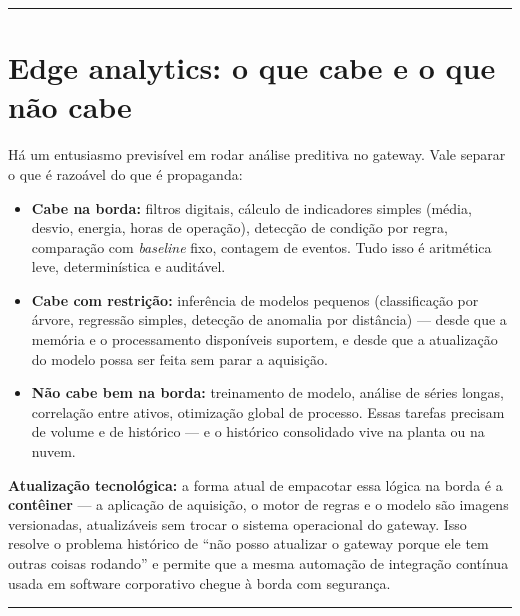 \begin{center}\rule{0.5\linewidth}{0.5pt}\end{center}

\section{Edge analytics: o que cabe e o que não cabe}\label{edge-analytics-o-que-cabe-e-o-que-nuxe3o-cabe}

Há um entusiasmo previsível em rodar análise preditiva no gateway. Vale separar o que é razoável do
que é propaganda:

\begin{itemize}
\tightlist
\item
  \textbf{Cabe na borda:} filtros digitais, cálculo de indicadores simples (média, desvio, energia,
  horas de operação), detecção de condição por regra, comparação com \emph{baseline} fixo, contagem de
  eventos. Tudo isso é aritmética leve, determinística e auditável.
\item
  \textbf{Cabe com restrição:} inferência de modelos pequenos (classificação por árvore, regressão
  simples, detecção de anomalia por distância) --- desde que a memória e o processamento disponíveis
  suportem, e desde que a atualização do modelo possa ser feita sem parar a aquisição.
\item
  \textbf{Não cabe bem na borda:} treinamento de modelo, análise de séries longas, correlação entre
  ativos, otimização global de processo. Essas tarefas precisam de volume e de histórico --- e o
  histórico consolidado vive na planta ou na nuvem.
\end{itemize}

\begin{caixanota}

\textbf{Atualização tecnológica:} a forma atual de empacotar essa lógica na borda é a
\textbf{contêiner} --- a aplicação de aquisição, o motor de regras e o modelo são imagens versionadas,
atualizáveis sem trocar o sistema operacional do gateway. Isso resolve o problema histórico de
``não posso atualizar o gateway porque ele tem outras coisas rodando'' e permite que a mesma
automação de integração contínua usada em software corporativo chegue à borda com segurança.

\end{caixanota}

\begin{center}\rule{0.5\linewidth}{0.5pt}\end{center}

